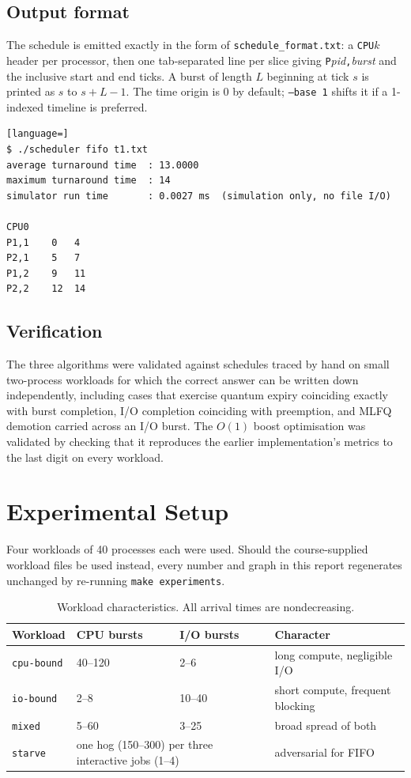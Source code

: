 \documentclass[11pt,a4paper]{article}
\begin{document}
\subsection{Output format}

The schedule is emitted exactly in the form of \texttt{schedule\_format.txt}:
a \texttt{CPU}$k$ header per processor, then one tab-separated line per slice
giving \texttt{P}\textit{pid}\texttt{,}\textit{burst} and the inclusive start
and end ticks. A burst of length $L$ beginning at tick $s$ is printed as
$s$ to $s+L-1$. The time origin is 0 by default; \texttt{--base 1} shifts it
if a 1-indexed timeline is preferred.

\begin{lstlisting}[language=]
$ ./scheduler fifo t1.txt
average turnaround time  : 13.0000
maximum turnaround time  : 14
simulator run time       : 0.0027 ms  (simulation only, no file I/O)

CPU0
P1,1	0	4
P2,1	5	7
P1,2	9	11
P2,2	12	14
\end{lstlisting}

\subsection{Verification}

The three algorithms were validated against schedules traced by hand on small
two-process workloads for which the correct answer can be written down
independently, including cases that exercise quantum expiry coinciding exactly
with burst completion, I/O completion coinciding with preemption, and MLFQ
demotion carried across an I/O burst. The $O(1)$ boost optimisation was
validated by checking that it reproduces the earlier implementation's metrics
to the last digit on every workload.

\section{Experimental Setup}

Four workloads of 40 processes each were used. Should the course-supplied
workload files be used instead, every number and graph in this report
regenerates unchanged by re-running \texttt{make experiments}.

\begin{table}[h]
\centering
\begin{tabular}{llll}
\toprule
Workload & CPU bursts & I/O bursts & Character \\
\midrule
\texttt{cpu-bound} & 40--120 & 2--6   & long compute, negligible I/O \\
\texttt{io-bound}  & 2--8    & 10--40 & short compute, frequent blocking \\
\texttt{mixed}     & 5--60   & 3--25  & broad spread of both \\
\texttt{starve}    & \multicolumn{2}{l}{one hog (150--300) per three interactive jobs (1--4)}
                   & adversarial for FIFO \\
\bottomrule
\end{tabular}
\caption{Workload characteristics. All arrival times are nondecreasing.}
\end{table}
\end{document}
